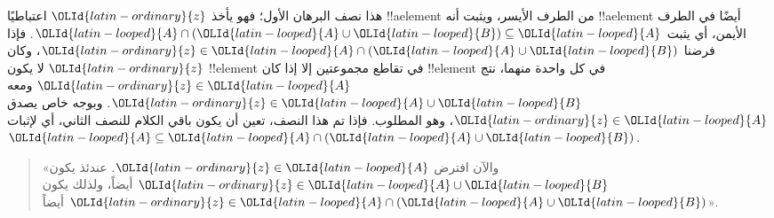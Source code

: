 \documentclass[../../../include/open-logic-section]{subfiles}
\begin{document}
هذا نصف البرهان الأول؛ فهو يأخذ $\OLId{latin-ordinary}{z}$ اعتباطيًا !!a{element} من الطرف
الأيسر، ويثبت أنه !!a{element} أيضًا في الطرف الأيمن، أي يثبت
$\OLId{latin-looped}{A} \cap (\OLId{latin-looped}{A} \cup \OLId{latin-looped}{B}) \subseteq \OLId{latin-looped}{A}$. فإذا فرضنا
$\OLId{latin-ordinary}{z} \in \OLId{latin-looped}{A} \cap (\OLId{latin-looped}{A} \cup \OLId{latin-looped}{B})$، وكان $\OLId{latin-ordinary}{z}$ لا يكون !!{element} في تقاطع
مجموعتين إلا إذا كان !!{element} في كل واحدة منهما، نتج
$\OLId{latin-ordinary}{z} \in \OLId{latin-looped}{A}$ ومعه $\OLId{latin-ordinary}{z} \in \OLId{latin-looped}{A} \cup \OLId{latin-looped}{B}$. وبوجه خاص يصدق $\OLId{latin-ordinary}{z} \in \OLId{latin-looped}{A}$، وهو
المطلوب. فإذا تم هذا النصف، تعين أن يكون باقي الكلام للنصف الثاني، أي
لإثبات
$\OLId{latin-looped}{A} \subseteq \OLId{latin-looped}{A} \cap (\OLId{latin-looped}{A} \cup \OLId{latin-looped}{B})$.

\begin{quote}
«والآن افترض $\OLId{latin-ordinary}{z} \in \OLId{latin-looped}{A}$. عندئذ يكون $\OLId{latin-ordinary}{z} \in \OLId{latin-looped}{A} \cup \OLId{latin-looped}{B}$ أيضاً، ولذلك يكون
$\OLId{latin-ordinary}{z} \in \OLId{latin-looped}{A} \cap (\OLId{latin-looped}{A} \cup \OLId{latin-looped}{B})$ أيضاً».
\end{quote}
\end{document}
